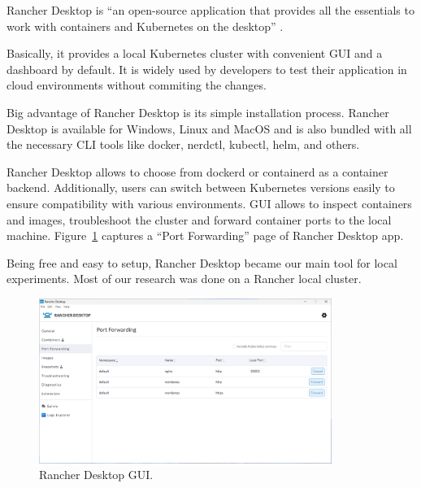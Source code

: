 Rancher Desktop is ``an open-source application that provides all the essentials to work with containers and Kubernetes on the desktop'' \cite{rancher-desktop}.

Basically, it provides a local Kubernetes cluster with convenient GUI and a dashboard by default. It is widely used by developers to test their application in cloud environments without commiting the changes. 

Big advantage of Rancher Desktop is its simple installation process. Rancher Desktop is available for Windows, Linux and MacOS and is also bundled with all the necessary CLI tools like docker, nerdctl, kubectl, helm, and others.

Rancher Desktop allows to choose from dockerd or containerd as a container backend. Additionally, users can switch between Kubernetes versions easily to ensure compatibility with various environments. GUI allows to inspect containers and images, troubleshoot the cluster and forward container ports to the local machine. Figure~\ref{img:rancher-desktop} captures a ``Port Forwarding'' page of Rancher Desktop app.

Being free and easy to setup, Rancher Desktop became our main tool for local experiments. Most of our research was done on a Rancher local cluster. 

\begin{figure}[!hbt]
	\begin{center}
		\includegraphics[width=0.85\textwidth]{images/rancher-desktop.png}
        \caption{Rancher Desktop GUI.}
		\label{img:rancher-desktop}
	\end{center}
\end{figure}